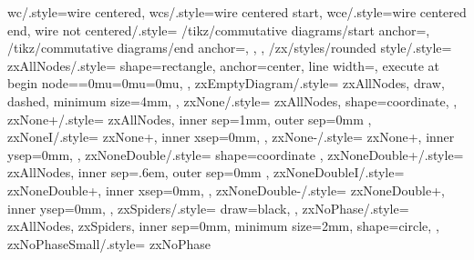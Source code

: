 {{    wc/.style={wire centered},
    wcs/.style={wire centered start},
    wce/.style={wire centered end},
    wire not centered/.style={
      /tikz/commutative diagrams/start anchor=,
      /tikz/commutative diagrams/end anchor=,
    },
  },
  /zx/styles/rounded style/.style={
    zxAllNodes/.style={
      shape=rectangle, %
      anchor=center,   %
      line width=\zxDefaultLineWidth,
      execute at begin node={\thinmuskip=0mu\medmuskip=0mu\thickmuskip=0mu}, %
    },
    zxEmptyDiagram/.style={
      zxAllNodes,
      draw,
      dashed,
      minimum size=4mm,
    },
    zxNone/.style={
      zxAllNodes,
      shape=coordinate, %
    },
    zxNone+/.style={
      zxAllNodes,
      inner sep=1mm,
      outer sep=0mm
    },
    zxNoneI/.style={
      zxNone+,
      inner xsep=0mm,
    },
    zxNone-/.style={
      zxNone+,
      inner ysep=0mm,
    },
    zxNoneDouble/.style={
      shape=coordinate
    },
    zxNoneDouble+/.style={
      zxAllNodes,
      inner sep=.6em,
      outer sep=0mm
    },
    zxNoneDoubleI/.style={
      zxNoneDouble+,
      inner xsep=0mm,
    },
    zxNoneDouble-/.style={
      zxNoneDouble+,
      inner ysep=0mm,
    },
    zxSpiders/.style={
      draw=black,
    },
    zxNoPhase/.style={
      zxAllNodes,
      zxSpiders,
      inner sep=0mm,
      minimum size=2mm,
      shape=circle,
    },
    zxNoPhaseSmall/.style={
      zxNoPhase
}}}
